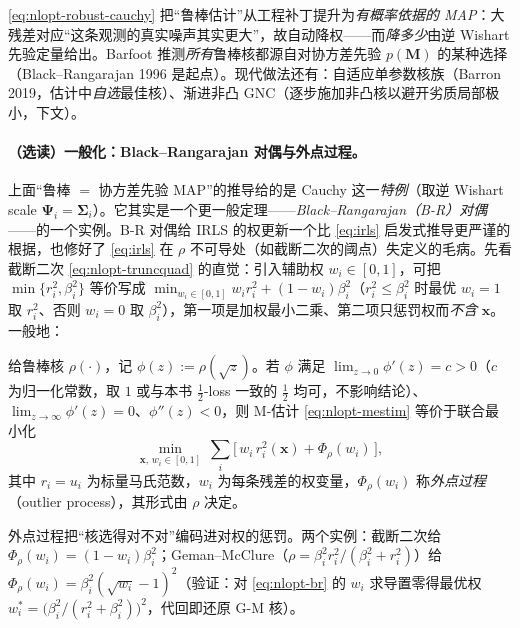 \begin{insight}[鲁棒核 $=$ 某协方差先验下的 MAP]
\cref{eq:nlopt-robust-cauchy} 把“鲁棒估计”从工程补丁提升为\emph{有概率依据的 MAP}：大残差对应“这条观测的真实噪声其实更大”，故自动降权——而\emph{降多少}由逆 Wishart 先验定量给出。Barfoot\cite{barfoot2024state} 推测\emph{所有}鲁棒核都源自对协方差先验 $p(\mathbf{M})$ 的某种选择（Black--Rangarajan 1996 是起点）。现代做法还有：自适应单参数核族（Barron 2019，估计中\emph{自选}最佳核）、渐进非凸 GNC（逐步施加非凸核以避开劣质局部极小，下文）。
\end{insight}

\paragraph{（选读）一般化：Black--Rangarajan 对偶与外点过程。}\cite{black1996rangarajan,carlone2026handbook}
上面“鲁棒 $=$ 协方差先验 MAP”的推导给的是 Cauchy 这一\emph{特例}（取逆 Wishart scale $\boldsymbol{\Psi}_i=\boldsymbol{\Sigma}_i$）。它其实是一个更一般定理——\emph{Black--Rangarajan（B-R）对偶}——的一个实例。B-R 对偶给 IRLS 的权更新一个比 \cref{eq:irls} 启发式推导更严谨的根据，也修好了 \cref{eq:irls} 在 $\rho$ 不可导处（如截断二次的阈点）失定义的毛病。先看截断二次 \cref{eq:nlopt-truncquad} 的直觉：引入辅助权 $w_i\in[0,1]$，可把 $\min\{r_i^2,\beta_i^2\}$ 等价写成 $\min_{w_i\in[0,1]}w_ir_i^2+(1-w_i)\beta_i^2$（$r_i^2\le\beta_i^2$ 时最优 $w_i{=}1$ 取 $r_i^2$、否则 $w_i{=}0$ 取 $\beta_i^2$），第一项是加权最小二乘、第二项只惩罚权而\emph{不含} $\mathbf{x}$。一般地：

\begin{theorem}\label{thm:nlopt-br}
给鲁棒核 $\rho(\cdot)$，记 $\phi(z):=\rho(\sqrt{z})$。若 $\phi$ 满足 $\lim_{z\to0}\phi'(z)=c>0$（$c$ 为归一化常数，取 $1$ 或与本书 $\tfrac12$-loss 一致的 $\tfrac12$ 均可，不影响结论）、$\lim_{z\to\infty}\phi'(z)=0$、$\phi''(z)<0$，则 M-估计 \cref{eq:nlopt-mestim} 等价于联合最小化
\begin{equation}
  \min_{\mathbf{x},\,w_i\in[0,1]}\ \sum_i\Big[\,w_i\,r_i^2(\mathbf{x})+\Phi_\rho(w_i)\,\Big],
  \label{eq:nlopt-br}
\end{equation}
其中 $r_i=u_i$ 为标量马氏范数，$w_i$ 为每条残差的权变量，$\Phi_\rho(w_i)$ 称\emph{外点过程}（outlier process），其形式由 $\rho$ 决定。
\end{theorem}

\noindent 外点过程把“核选得对不对”编码进对权的惩罚。两个实例：截断二次给 $\Phi_\rho(w_i)=(1-w_i)\beta_i^2$；Geman--McClure（$\rho=\beta_i^2 r_i^2/(\beta_i^2+r_i^2)$）给 $\Phi_\rho(w_i)=\beta_i^2(\sqrt{w_i}-1)^2$（验证：对 \cref{eq:nlopt-br} 的 $w_i$ 求导置零得最优权 $w_i^*=\big(\beta_i^2/(r_i^2+\beta_i^2)\big)^2$，代回即还原 G-M 核）。

